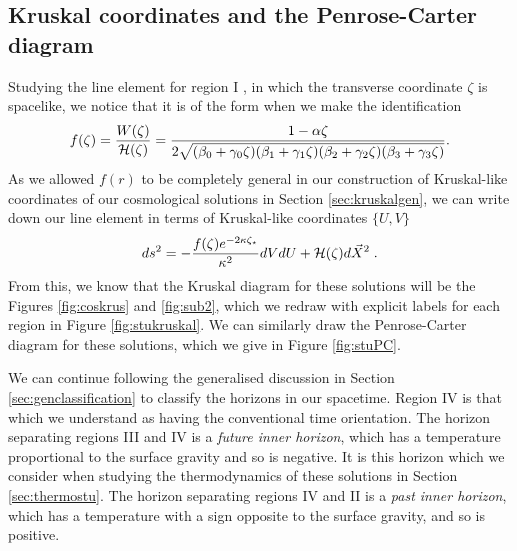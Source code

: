 \subsection{Kruskal coordinates and the Penrose-Carter diagram}
\label{sec:stukruskalclassification}
Studying the line element for region I , in which the transverse coordinate $\zeta$ is spacelike, we notice that it is of the form  when we make the identification
\begin{equation*}
	f(\zeta) = \frac{W(\zeta)}{{\cal H}(\zeta)} = \frac{1 - \alpha \zeta}{2 \sqrt{(\beta_0 + \gamma_0 \zeta)(\beta_1 + \gamma_1 \zeta)(\beta_2 + \gamma_2 \zeta)(\beta_3 + \gamma_3 \zeta)}}.
\end{equation*} 
As we allowed $f(r)$ to be completely general in our construction of Kruskal-like coordinates of our cosmological solutions in Section \ref{sec:kruskalgen}, we can write down our line element in terms of Kruskal-like coordinates $\{U,V\}$
\begin{equation*}
     ds^2 = - \frac{f(\zeta) e^{-2\kappa \zeta_\star}}{\kappa^2} dV dU + {\cal H}(\zeta) d\vec{X}^2 \;.
\end{equation*}
From this, we know that the Kruskal diagram for these solutions will be the Figures \ref{fig:coskrus} and \ref{fig:sub2}, which we redraw with explicit labels for each region in Figure \ref{fig:stukruskal}. We can similarly draw the Penrose-Carter diagram for these solutions, which we give in Figure \ref{fig:stuPC}.

We can continue following the generalised discussion in Section \ref{sec:genclassification} to classify the horizons in our spacetime. Region IV is that which we understand as having the conventional time orientation. The horizon separating regions III and IV is a \emph{future inner horizon}, which has a temperature proportional to the surface gravity and so is negative. It is this horizon which we consider when studying the thermodynamics of these solutions in Section \ref{sec:thermostu}. The horizon separating regions IV and II is a \emph{past inner horizon}, which has a temperature with a sign opposite to the surface gravity, and so is positive.

